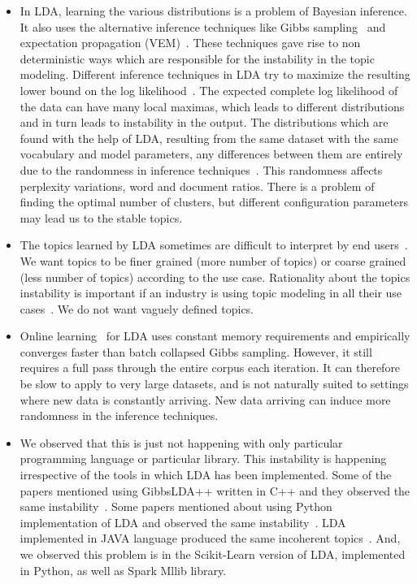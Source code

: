 \documentclass[conference]{IEEEtran}
\theoremstyle{break}
\begin{document}
\begin{itemize}
    \item In LDA, learning the various distributions is a problem of Bayesian inference. It also uses the alternative inference techniques like Gibbs sampling~\cite{wei2006lda} and expectation propagation (VEM)~\cite{minka2002expectation}. These techniques gave rise to non deterministic ways which are responsible for the instability in the topic modeling. Different inference techniques in LDA try to maximize the resulting lower bound on the log likelihood~\cite{blei2003latent}. The expected complete log likelihood of the data can have many local maximas, which leads to different distributions and in turn leads to instability in the output. The distributions which are found with the help of LDA, resulting from the same dataset with the same vocabulary and model parameters, any differences between them are entirely due to the randomness in inference techniques~\cite{koltcov2014latent}. This randomness affects perplexity variations, word and document ratios. There is a problem of finding the optimal number of clusters, but different configuration parameters may lead us to the stable topics.
    \item The topics learned by LDA sometimes are difficult to interpret by end users~\cite{yang2015improving, panichella2013effectively}. We want topics to be finer grained (more number of topics) or coarse grained (less number of topics) according to the use case. Rationality about the topics instability is important if an industry is using topic modeling in all their use cases~\cite{lau2014machine, o2015analysis}. We do not want vaguely defined topics.
    \item Online learning~\cite{hoffman2010online} for LDA uses constant memory requirements and empirically converges faster than batch collapsed Gibbs sampling. However, it still requires a full pass through the entire corpus each iteration. It can therefore be slow to apply to very large datasets, and is not naturally suited to settings where new data is constantly arriving. New data arriving can induce more randomness in the inference techniques.
    \item We observed that this is just not happening with only particular programming language or particular library. This instability is happening irrespective of the tools in which LDA has been implemented. Some of the papers mentioned using GibbsLDA++ written in C++ and they observed the same instability~\cite{lukins2008source, tian2009using, guzman2014users}. Some papers mentioned about using Python implementation of LDA and observed the same instability~\cite{guzman2014users}. LDA implemented in JAVA language produced the same incoherent topics~\cite{martin2015app, hindle2011automated}. And, we observed this problem is in the Scikit-Learn version of LDA, implemented in Python, as well as Spark Mllib library.
\end{itemize}
\end{document}
